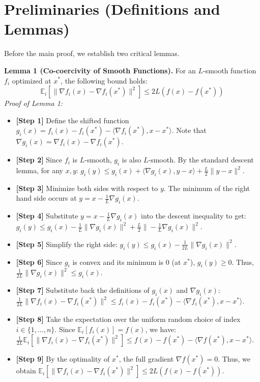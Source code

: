 \documentclass[11pt]{article}
\begin{document}
\section*{Preliminaries (Definitions and Lemmas)}

Before the main proof, we establish two critical lemmas.

\textbf{Lemma 1 (Co-coercivity of Smooth Functions).} 
For an $L$-smooth function $f_i$ optimized at $x^*$, the following bound holds:
\begin{equation}
    \mathbb{E}_{i}[\|\nabla f_i(x) - \nabla f_i(x^*)\|^2] \leq 2L (f(x) - f(x^*))
\end{equation}
\textit{Proof of Lemma 1:}
\begin{itemize}
    \item \textbf{[Step 1]} Define the shifted function $g_i(x) = f_i(x) - f_i(x^*) - \langle \nabla f_i(x^*), x - x^* \rangle$. Note that $\nabla g_i(x) = \nabla f_i(x) - \nabla f_i(x^*)$.
    \item \textbf{[Step 2]} Since $f_i$ is $L$-smooth, $g_i$ is also $L$-smooth. By the standard descent lemma, for any $x, y$: $g_i(y) \leq g_i(x) + \langle \nabla g_i(x), y - x \rangle + \frac{L}{2} \|y - x\|^2$.
    \item \textbf{[Step 3]} Minimize both sides with respect to $y$. The minimum of the right hand side occurs at $y = x - \frac{1}{L} \nabla g_i(x)$.
    \item \textbf{[Step 4]} Substitute $y = x - \frac{1}{L} \nabla g_i(x)$ into the descent inequality to get: $g_i(y) \leq g_i(x) - \frac{1}{L} \|\nabla g_i(x)\|^2 + \frac{L}{2} \|-\frac{1}{L} \nabla g_i(x)\|^2$.
    \item \textbf{[Step 5]} Simplify the right side: $g_i(y) \leq g_i(x) - \frac{1}{2L} \|\nabla g_i(x)\|^2$.
    \item \textbf{[Step 6]} Since $g_i$ is convex and its minimum is 0 (at $x^*$), $g_i(y) \geq 0$. Thus, $\frac{1}{2L} \|\nabla g_i(x)\|^2 \leq g_i(x)$.
    \item \textbf{[Step 7]} Substitute back the definitions of $g_i(x)$ and $\nabla g_i(x)$: $\frac{1}{2L} \|\nabla f_i(x) - \nabla f_i(x^*)\|^2 \leq f_i(x) - f_i(x^*) - \langle \nabla f_i(x^*), x - x^* \rangle$.
    \item \textbf{[Step 8]} Take the expectation over the uniform random choice of index $i \in \{1, \dots, n\}$. Since $\mathbb{E}_i[f_i(x)] = f(x)$, we have: $\frac{1}{2L} \mathbb{E}_i[\|\nabla f_i(x) - \nabla f_i(x^*)\|^2] \leq f(x) - f(x^*) - \langle \nabla f(x^*), x - x^* \rangle$.
    \item \textbf{[Step 9]} By the optimality of $x^*$, the full gradient $\nabla f(x^*) = 0$. Thus, we obtain $\mathbb{E}_i[\|\nabla f_i(x) - \nabla f_i(x^*)\|^2] \leq 2L(f(x) - f(x^*))$.
\end{itemize}
\end{document}
